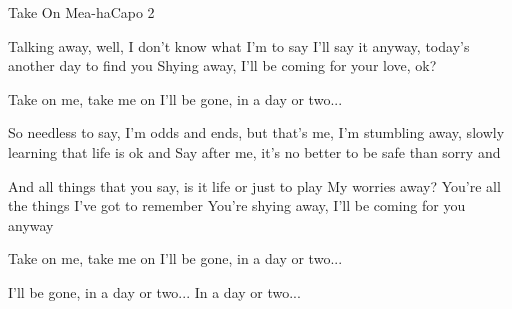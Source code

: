 \begin{song}{Take On Me}{a-ha}{Capo 2}


Talking away,   well, I don't know what I'm to say
I'll say it anyway,   today's another day to find you
Shying away,    I'll be coming for your love, ok?

Take   on   me,         take   me   on
I'll   be   gone,  in a day or two...

So needless to say,  I'm odds and ends, but that's me,
I'm stumbling away,    slowly learning that life is ok and
Say after me,     it's no better to be safe than sorry and



And all things that you say,    is it life or just to play
My worries away?    You're all the things I've got to remember
You're shying away,  I'll be coming for you anyway

Take   on   me,         take   me   on
I'll   be   gone,  in a day or two...

I'll   be   gone,  in a day or two...
In a day or two...
\end{song}
